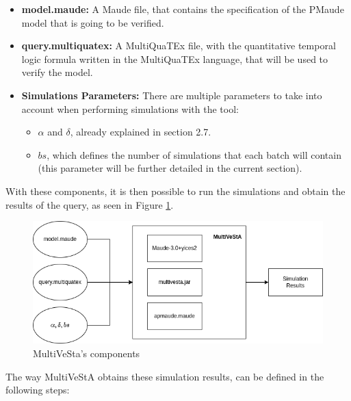 \begin{itemize}
    \item \textbf{model.maude:} A Maude file, that contains the specification of the PMaude model that is going to be verified.
    \item \textbf{query.multiquatex:} A MultiQuaTEx file, with the quantitative temporal logic formula written in the MultiQuaTEx language, that will be used to verify the model.
    \item \textbf{Simulations Parameters:} There are multiple parameters to take into account when performing simulations with the tool:
    \begin{itemize}
        \item $\alpha$ and $\delta$, already explained in section 2.7.
        \item $bs$, which defines the number of simulations that each batch will contain (this parameter will be further detailed in the current section).
    \end{itemize}
\end{itemize}
With these components, it is then possible to run the simulations and obtain the results of the query, as seen in Figure \ref{fig:multi1}.
\begin{figure}[h]
    \centering
    \includegraphics[scale = 0.5]{images/multi1.png}
    \caption{MultiVeSta's components}
    \label{fig:multi1}
\end{figure}
The way MultiVeStA obtains these simulation results, can be defined in the following steps:
